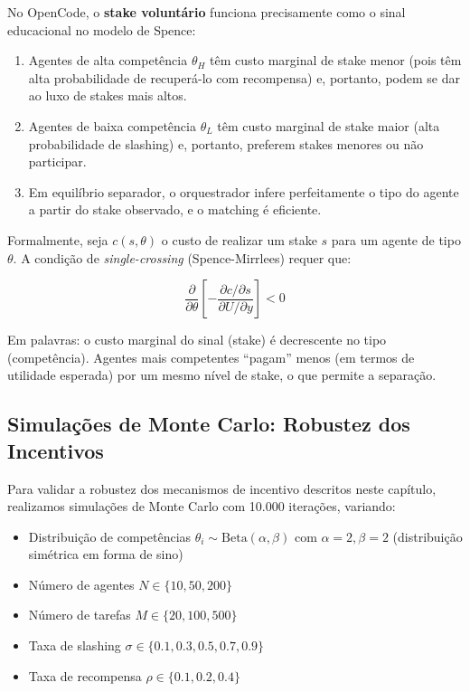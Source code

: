 No OpenCode, o \textbf{stake voluntário} funciona precisamente como o sinal educacional no modelo de Spence:

\begin{enumerate}
    \item Agentes de alta competência $\theta_H$ têm custo marginal de stake menor (pois têm alta probabilidade de recuperá-lo com recompensa) e, portanto, podem se dar ao luxo de stakes mais altos.
    
    \item Agentes de baixa competência $\theta_L$ têm custo marginal de stake maior (alta probabilidade de slashing) e, portanto, preferem stakes menores ou não participar.
    
    \item Em equilíbrio separador, o orquestrador infere perfeitamente o tipo do agente a partir do stake observado, e o matching é eficiente.
\end{enumerate}

Formalmente, seja $c(s, \theta)$ o custo de realizar um stake $s$ para um agente de tipo $\theta$. A condição de \textit{single-crossing} (Spence-Mirrlees) requer que:

\begin{equation}\label{eq:single_crossing}
\frac{\partial}{\partial \theta} \left[-\frac{\partial c / \partial s}{\partial U / \partial y}\right] < 0
\end{equation}

Em palavras: o custo marginal do sinal (stake) é decrescente no tipo (competência). Agentes mais competentes ``pagam'' menos (em termos de utilidade esperada) por um mesmo nível de stake, o que permite a separação.

\subsection{Simulações de Monte Carlo: Robustez dos Incentivos}

Para validar a robustez dos mecanismos de incentivo descritos neste capítulo, realizamos simulações de Monte Carlo com 10.000 iterações, variando:

\begin{itemize}
    \item Distribuição de competências $\theta_i \sim \text{Beta}(\alpha, \beta)$ com $\alpha=2, \beta=2$ (distribuição simétrica em forma de sino)
    \item Número de agentes $N \in \{10, 50, 200\}$
    \item Número de tarefas $M \in \{20, 100, 500\}$
    \item Taxa de slashing $\sigma \in \{0.1, 0.3, 0.5, 0.7, 0.9\}$
    \item Taxa de recompensa $\rho \in \{0.1, 0.2, 0.4\}$
\end{itemize}

